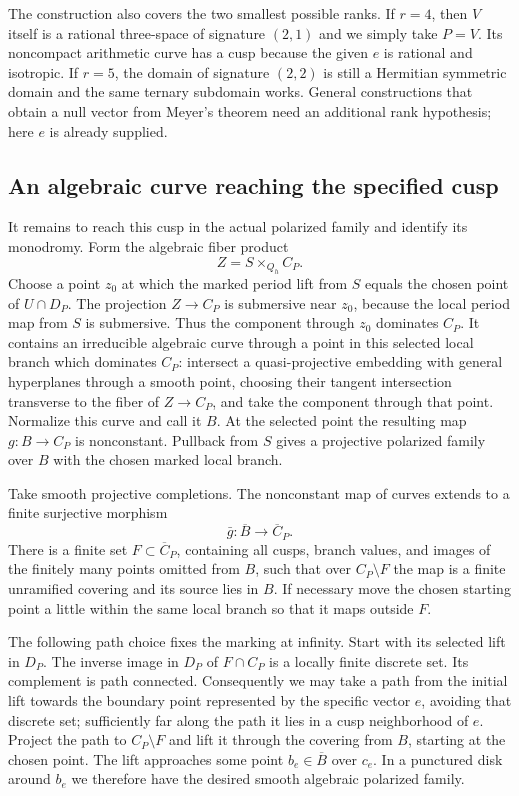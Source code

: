 The construction also covers the two smallest possible ranks.
If $r=4$, then $V$ itself is a rational three-space of signature
$(2,1)$ and we simply take $P=V$.  Its noncompact arithmetic curve
has a cusp because the given $e$ is rational and isotropic.  If
$r=5$, the domain of signature $(2,2)$ is still a Hermitian
symmetric domain and the same ternary subdomain works.  General
constructions that obtain a null vector from Meyer's theorem need
an additional rank hypothesis; here $e$ is already supplied.

\subsection{An algebraic curve reaching the specified cusp}

It remains to reach this cusp in the actual polarized family and
identify its monodromy.  Form the algebraic fiber product
\[
 Z=S\times_{Q_h}C_P.
\]
Choose a point $z_0$ at which the marked period lift from $S$
equals the chosen point of $U\cap D_P$.  The
projection $Z\to C_P$ is submersive near $z_0$, because the local
period map from $S$ is submersive.  Thus the component through
$z_0$ dominates $C_P$.  It contains an irreducible algebraic curve
through a point in this selected local branch which dominates
$C_P$: intersect a quasi-projective embedding with general
hyperplanes through a smooth point, choosing their tangent
intersection transverse to the fiber of $Z\to C_P$, and take the
component through that point.  Normalize this curve and call it
$B$.  At the selected point the resulting map $g:B\to C_P$ is
nonconstant.  Pullback from $S$ gives a projective polarized family
over $B$ with the chosen marked local branch.

Take smooth projective completions.  The nonconstant map of curves
extends to a finite surjective morphism
\[
 \bar g:\overline B\longrightarrow\overline C_P.
\]
There is a finite set $F\subset\overline C_P$, containing all cusps,
branch values, and images of the finitely many points omitted
from $B$, such that over $C_P\setminus F$ the map is a finite
unramified covering and its source lies in $B$.  If necessary move
the chosen starting point a little within the same local branch
so that it maps outside $F$.

The following path choice fixes the marking at infinity.  Start
with its selected lift in $D_P$.  The inverse image in $D_P$ of
$F\cap C_P$ is a locally finite discrete set.  Its complement is
path connected.  Consequently we may take a path from the initial
lift towards the boundary point represented by the specific vector
$e$, avoiding that discrete set; sufficiently far along the path
it lies in a cusp neighborhood of $e$.  Project the path to
$C_P\setminus F$ and lift it through the covering from $B$, starting
at the chosen point.  The lift approaches some point
$b_e\in\overline B$ over $c_e$.  In a punctured disk around $b_e$
we therefore have the desired smooth algebraic polarized family.

